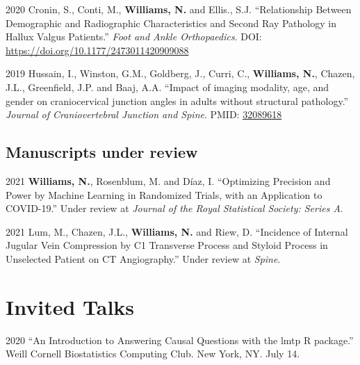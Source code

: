 \documentclass[12pt,letterpaper]{report}
\begin{document}
\begin{tablist}
	\item[2020] \tab Cronin, S., Conti, M., \textbf{Williams, N.} and Ellis., S.J. \enquote{Relationship Between Demographic and Radiographic Characteristics and Second Ray Pathology in Hallux Valgus Patients.} \textit{Foot and Ankle Orthopaedics}. DOI: \href{https://doi.org/10.1177/2473011420909088}{https://doi.org/10.1177/2473011420909088}

	\item[2019] \tab Hussain, I., Winston, G.M., Goldberg, J., Curri, C., \textbf{Williams, N.}, Chazen, J.L., Greenfield, J.P. and Baaj, A.A. \enquote{Impact of imaging modality, age, and gender on craniocervical junction angles in adults without structural pathology.} \textit{Journal of Craniovertebral Junction and Spine}. PMID: \href{https://www.ncbi.nlm.nih.gov/pubmed/32089618}{32089618}

    \end{tablist}
    
    \subsection*{Manuscripts under review}
    
    \begin{tablist}
    
    \item[2021] \tab \textbf{Williams, N.}, Rosenblum, M. and Díaz, I. \enquote {Optimizing Precision and Power by Machine Learning in Randomized Trials, with an Application to COVID-19.} Under review at \textit {Journal of the Royal Statistical Society: Series A}.
    
    \item[2021] \tab Lum, M., Chazen, J.L., \textbf{Williams, N.} and Riew, D. \enquote {Incidence of Internal Jugular Vein Compression by C1 Transverse Process and Styloid Process in Unselected Patient on CT Angiography.} Under review at \textit {Spine}.

    
    \end{tablist}

    \section*{Invited Talks}

    \begin{tablist}

        \item[2020] \tab \enquote{An Introduction to Answering Causal Questions with the lmtp R package.} Weill Cornell Biostatistics Computing Club. New York, NY. July 14.

    \end{tablist}
    
\end{document}
